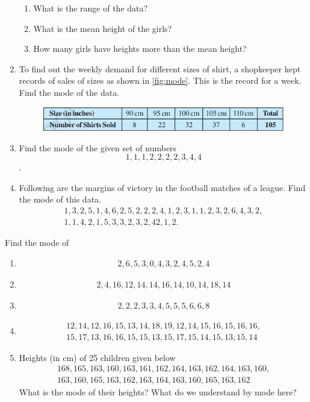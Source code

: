 \begin{enumerate}[label=\thesection.\arabic*, ref=\thesection.\theenumi]
\begin{enumerate}
		\item What is the range of the data?
		\item What is the mean height of the girls?
		\item How many girls have heights more than the mean height?
	\end{enumerate}
\item To find out the weekly demand for different sizes of shirt, a shopkeeper kept records of sales of sizes as shown in 
  \eqref{fig:mode}.  This is the record for a week.  Find the mode of the data.
	\begin{figure}[H]
  \centering
  \includegraphics[width=\columnwidth]{figs/mode.jpg}
  \caption{}
  \label{fig:mode}
\end{figure}
\item Find the mode of the given set of numbers
	$$1,1,1,2,2,2,2,3,4,4$$.
\item Following are the margins of victory in the football matches of a league.  Find the mode of this data.
	\begin{gather*}
	1,3,2,5,1,4,6,2,5,2,2,2,4,1,2,3,1,1,2,3,2,6,4,3,2,
	\\
	1,1,4,2,1,5,3,3,2,3,2,42,1,2.
	\end{gather*}
\end{enumerate}
Find the mode of
\begin{enumerate}[label=\thesection.\arabic*, ref=\thesection.\theenumi,resume*]
\item 	
		\begin{gather*}
		2,6,5,3,0,4,3,2,4,5,2,4
	\end{gather*}
\item 
		\begin{gather*}
		2,4,16,12,14,14,16,14,10,14,18,14
	\end{gather*}
	\item 
		\begin{gather*}
		2,2,2,3,3,4,5,5,5,6,6,8
	\end{gather*}
	\item 
		\begin{gather*}
		12, 14, 12, 16, 15, 13, 14, 18, 19, 12, 14, 15, 16, 15, 16, 16,
	\\
		15, 17, 13, 16, 16, 15, 15, 13, 15, 17, 15, 14, 15, 13, 15, 14
		\end{gather*}
	\item Heights (in cm) of 25 children given below
		\begin{gather*}
		168, 165, 163, 160, 163, 161, 162, 164, 163, 162,
164, 163,	160, 
		\\
	 163, 160, 165, 163, 162, 163, 164, 163, 160, 165, 163, 162 
	\end{gather*}
		What is the mode of their heights? What do we understand by mode here?
\end{enumerate}
